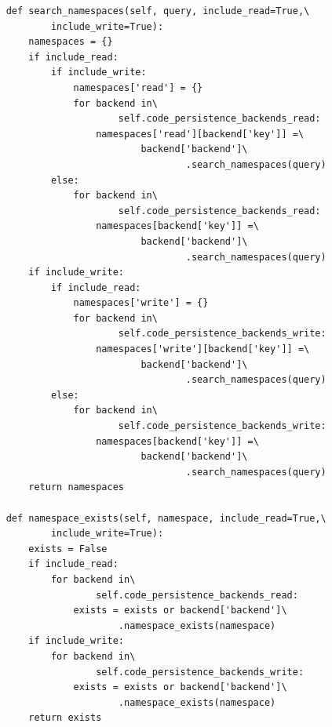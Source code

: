 \begin{lstlisting}
    def search_namespaces(self, query, include_read=True,\
            include_write=True):
        namespaces = {}
        if include_read:
            if include_write:
                namespaces['read'] = {}
                for backend in\
                        self.code_persistence_backends_read:
                    namespaces['read'][backend['key']] =\
                            backend['backend']\
                                    .search_namespaces(query)
            else:
                for backend in\
                        self.code_persistence_backends_read:
                    namespaces[backend['key']] =\
                            backend['backend']\
                                    .search_namespaces(query)
        if include_write:
            if include_read:
                namespaces['write'] = {}
                for backend in\
                        self.code_persistence_backends_write:
                    namespaces['write'][backend['key']] =\
                            backend['backend']\
                                    .search_namespaces(query)
            else:
                for backend in\
                        self.code_persistence_backends_write:
                    namespaces[backend['key']] =\
                            backend['backend']\
                                    .search_namespaces(query)
        return namespaces

    def namespace_exists(self, namespace, include_read=True,\
            include_write=True):
        exists = False
        if include_read:
            for backend in\
                    self.code_persistence_backends_read:
                exists = exists or backend['backend']\
                        .namespace_exists(namespace)
        if include_write:
            for backend in\
                    self.code_persistence_backends_write:
                exists = exists or backend['backend']\
                        .namespace_exists(namespace)
        return exists


\end{lstlisting}
